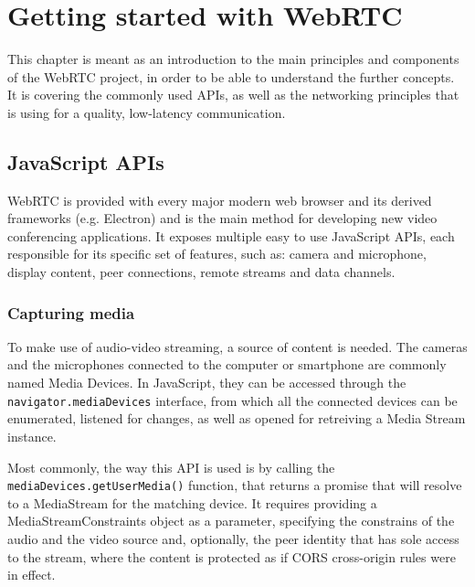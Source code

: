 
\chapter{Getting started with WebRTC}
\label{chap:ch2}

\indent \par This chapter is meant as an introduction to the main principles and components of the WebRTC project, in order to be able to understand the further concepts. It is covering the commonly used APIs, as well as the networking principles that is using for a quality, low-latency communication.


\section{JavaScript APIs}
\label{sec:ch2sec1}
\indent \par WebRTC is provided with every major modern web browser and its derived frameworks (e.g. Electron) and is the main method for developing new video conferencing applications. It exposes multiple easy to use JavaScript APIs, each responsible for its specific set of features, such as: camera and microphone, display content, peer connections, remote streams and data channels.

\subsection{Capturing media}
\label{sec:ch2sec1subsec1}
\indent \par To make use of audio-video streaming, a source of content is needed. The cameras and the microphones connected to the computer or smartphone are commonly named Media Devices. In JavaScript, they can be accessed through the \texttt{navigator.mediaDevices} interface, from which all the connected devices can be enumerated, listened for changes, as well as opened for retreiving a Media Stream instance. \cite{WebRTC2014}

\indent \par Most commonly, the way this API is used is by calling the \texttt{mediaDevices.getUserMedia()} function, that returns a promise that will resolve to a MediaStream for the matching device. It requires providing a MediaStreamConstraints object as a parameter, specifying the constrains of the audio and the video source and, optionally, the peer identity that has sole access to the stream, where the content is protected as if CORS cross-origin rules were in effect.


